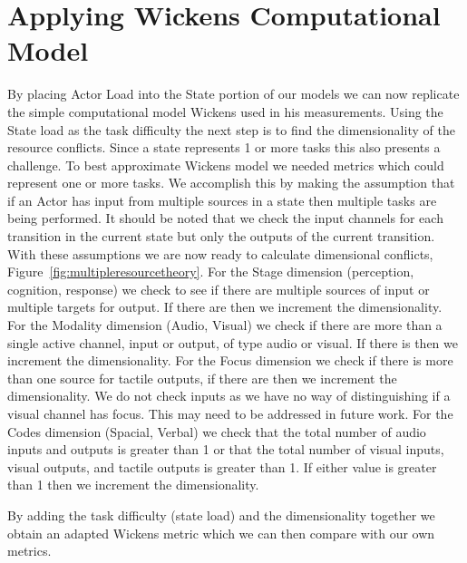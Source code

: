 \section{Applying Wickens Computational Model}
By placing Actor Load into the State portion of our models we can now replicate the simple computational model Wickens used in his measurements.  Using the State load as the task difficulty the next step is to find the dimensionality of the resource conflicts.  Since a state represents 1 or more tasks this also presents a challenge.  To best approximate Wickens model we needed metrics which could represent one or more tasks.  We accomplish this by making the assumption that if an Actor has input from multiple sources in a state then multiple tasks are being performed.  It should be noted that we check the input channels for each transition in the current state but only the outputs of the current transition.  With these assumptions we are now ready to calculate dimensional conflicts, Figure~\ref{fig:multipleresourcetheory}.
For the Stage dimension (perception, cognition, response) we check to see if there are multiple sources of input or multiple targets for output.  If there are then we increment the dimensionality.   
For the Modality dimension (Audio, Visual) we check if there are more than a single active channel, input or output, of type audio or visual.  If there is then we increment the dimensionality.  
For the Focus dimension we check if there is more than one source for tactile outputs, if there are then we increment the dimensionality.  We do not check inputs as we have no way of distinguishing if a visual channel has focus.  This may need to be addressed in future work. 
For the Codes dimension (Spacial, Verbal) we check that the total number of audio inputs and outputs is greater than 1 or that the total number of visual inputs, visual outputs, and tactile outputs is greater than 1.  If either value is greater than 1 then we increment the dimensionality.  

By adding the task difficulty (state load) and the dimensionality together we obtain an adapted Wickens metric which we can then compare with our own metrics.

